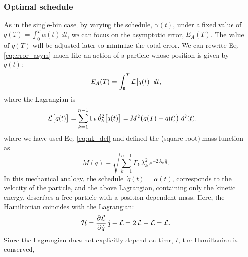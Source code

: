 \documentclass[reprint, superscriptaddress, floatfix]{revtex4-1}
\newcommand{\Err}{E}
\begin{document}
\subsubsection{\label{sec:optschedule}
Optimal schedule}



As in the single-bin case,
by varying the schedule, $\alpha(t)$, under a fixed value of
$q(T) = \int_0^T \alpha(t) \, dt$,
we can focus on the asymptotic error,
$\Err_A(T)$.
%
The value of $q(T)$ will be adjusted later
to minimize the total error. %
%
We can rewrite Eq. \eqref{eq:error_asym} much like an action
of a particle whose position is given by $q(t)$:
%
\begin{equation}
  \Err_A(T)
  =
  \int_0^T
    {\mathcal L} \bigl[ q(t)\bigr]
    \, dt
  ,
  \notag
\end{equation}
%
where the Lagrangian is
%
\begin{align}
  {\mathcal L} \bigl[ q(t) \bigr]
  &=
  \sum_{ k = 1 }^{n - 1}
    \Gamma_k \, {\dot \theta}_k^2\bigl[ q(t) \bigr]
  =
  M^2\bigl(q(T) - q(t) \bigr)
  \; \dot q^2( t )
  .
\notag
\end{align}
%
where we have
used Eq. \eqref{eq:uk_def} and
defined the (square-root) mass function as
%
\begin{equation}
  M(\bar q)
  \equiv
  \sqrt{
    \textstyle\sum_{ k = 1 }^{n - 1}
    \Gamma_k \, \lambda_k^2 \, e^{-2 \, \lambda_k \, \bar q}
  }
  .
  \label{eq:mass_func}
\end{equation}
%
In this mechanical analogy,
the schedule, $\dot q(t) = \alpha(t)$,
corresponds to the velocity of the particle,
%
and the above Lagrangian, containing only the kinetic energy,
describes a free particle
with a position-dependent mass.
%
Here, the Hamiltonian coincides with the Lagrangian:
%
\begin{equation}
  \mathcal H
  =
  \frac{ \partial \mathcal L }
       { \partial \dot q     }
  \, \dot q
  -
  \mathcal L
  =
  2 \, \mathcal L
  - \mathcal L
  =
  \mathcal L
  .
  \notag
\end{equation}
%
Since the Lagrangian
does not explicitly depend on time, $t$,
the Hamiltonian is conserved,\cite{goldstein, *landau_mechanics, *arnold, *jose}
\end{document}
